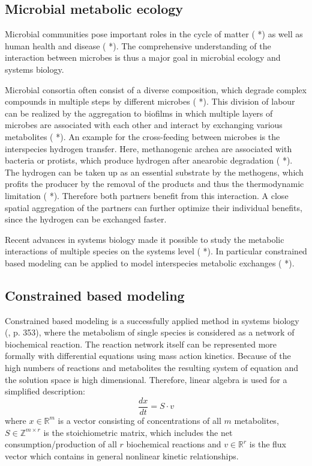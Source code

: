\subsection{Microbial metabolic ecology}
Microbial communities pose important roles in the cycle of matter ( *) as well as human health and disease ( *). The comprehensive understanding of the interaction between microbes is thus a major goal in microbial ecology and systems biology. 

Microbial consortia often consist of a diverse composition, which degrade complex compounds in multiple steps by different microbes ( *). This division of labour can be realized by the aggregation to biofilms in which multiple layers of microbes are associated with each other and interact by exchanging various metabolites ( *). An example for the cross-feeding between microbes is the interspecies hydrogen transfer. Here, methanogenic archea are associated with bacteria or protists, which produce hydrogen after anearobic degradation ( *). The hydrogen can be taken up as an essential substrate by the methogens, which profits the producer by the removal of the products and thus the thermodynamic limitation ( *). Therefore both partners benefit from this interaction. A close spatial aggregation of the partners can further optimize their individual benefits, since the hydrogen can be exchanged faster.

Recent advances in systems biology made it possible to study the metabolic interactions of multiple species on the systems level ( *). In particular constrained based modeling can be applied to model interspecies metabolic exchanges ( *).
 
\subsection{Constrained based modeling}
Constrained based modeling is a successfully applied method in systems biology (\cite{Esvelt2013}, \cite{Klipp2010} p. 353), where the metabolism of single species is considered as a network of biochemical reaction.
The reaction network itself can be represented more formally with differential equations using mass action kinetics.
Because of the high numbers of reactions and metabolites the resulting system of equation and the solution space is high dimensional.
Therefore, linear algebra is used for a simplified description:
\[
  \frac{dx}{dt}=S \cdot v
\]
where $x\in \mathbb{R}^m$ is a vector consisting of concentrations of all $m$ metabolites, $S\in \mathbb{Z}^{m\times r}$ is the stoichiometric matrix, which includes the net consumption/production of all $r$ biochemical reactions and $v \in \mathbb{R}^r$ is the flux vector which contains in general nonlinear kinetic relationships.

